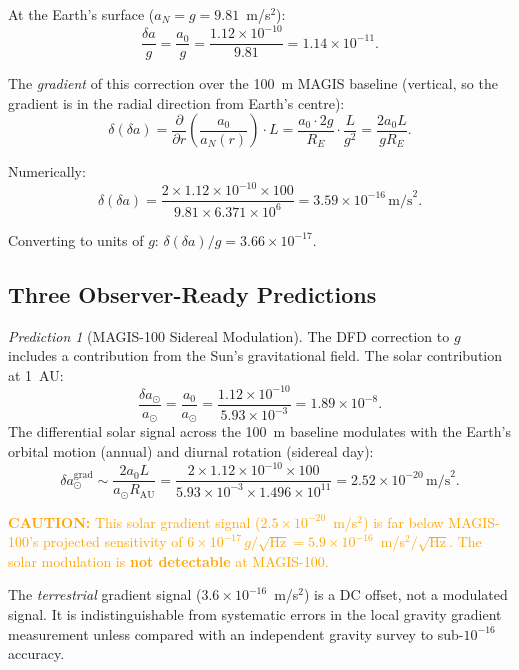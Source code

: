 \documentclass[11pt]{article}
\theoremstyle{definition}
\theoremstyle{remark}
\newtheorem{prediction}[theorem]{Prediction}
\newcommand{\ee}[1]{\times10^{#1}}
\newcommand{\azero}{a_0}
\newcommand{\caution}[1]{\textcolor{orange}{\textbf{CAUTION:} #1}}
\begin{document}
At the Earth's surface ($a_N = g = 9.81$~m/s$^2$):
\begin{equation}
\frac{\delta a}{g} = \frac{\azero}{g}
= \frac{1.12\ee{-10}}{9.81}
= 1.14\ee{-11}.
\label{eq:delta-a-surface}
\end{equation}

The \emph{gradient} of this correction over the 100~m MAGIS baseline
(vertical, so the gradient is in the radial direction from Earth's centre):
\begin{equation}
\delta(\delta a) = \frac{\partial}{\partial r}\left(\frac{\azero}{a_N(r)}\right) \cdot L
= \frac{\azero \cdot 2g}{R_E} \cdot \frac{L}{g^2}
= \frac{2\azero L}{g R_E}.
\label{eq:gradient-signal}
\end{equation}

Numerically:
\begin{equation}
\delta(\delta a) = \frac{2 \times 1.12\ee{-10} \times 100}{9.81 \times 6.371\ee{6}}
= 3.59\ee{-16}\,\mathrm{m/s}^2.
\label{eq:gradient-numerical}
\end{equation}

Converting to units of $g$: $\delta(\delta a)/g = 3.66\ee{-17}$.

\subsection{Three Observer-Ready Predictions}

\begin{prediction}[MAGIS-100 Sidereal Modulation]
\label{pred:sidereal}
The DFD correction to $g$ includes a contribution from the Sun's
gravitational field. The solar contribution at 1~AU:
\begin{equation}
\frac{\delta a_\odot}{a_\odot} = \frac{\azero}{a_\odot}
= \frac{1.12\ee{-10}}{5.93\ee{-3}}
= 1.89\ee{-8}.
\end{equation}
The differential solar signal across the 100~m baseline modulates with
the Earth's orbital motion (annual) and diurnal rotation (sidereal day):
\begin{equation}
\delta a_\odot^{\mathrm{grad}} \sim \frac{2\azero L}{a_\odot R_{\mathrm{AU}}}
= \frac{2 \times 1.12\ee{-10} \times 100}{5.93\ee{-3} \times 1.496\ee{11}}
= 2.52\ee{-20}\,\mathrm{m/s}^2.
\end{equation}

\caution{This solar gradient signal ($2.5\ee{-20}$~m/s$^2$) is far below
MAGIS-100's projected sensitivity of $6\ee{-17}\,g/\sqrt{\mathrm{Hz}}
= 5.9\ee{-16}$~m/s$^2/\sqrt{\mathrm{Hz}}$. The solar modulation is
\textbf{not detectable} at MAGIS-100.}

The \emph{terrestrial} gradient signal ($3.6\ee{-16}$~m/s$^2$) is
a DC offset, not a modulated signal. It is indistinguishable from
systematic errors in the local gravity gradient measurement unless
compared with an independent gravity survey to sub-$10^{-16}$ accuracy.
\end{prediction}
\end{document}
